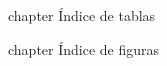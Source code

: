 \documentclass[a4paper,12pt,proyecto]{iietesis}
\begin{document}
\appendix





\backmatter

\nocite{*} %

\newpage{}%



\newpage{} {chapter} {\'Indice de tablas}%
\listoftables %

\newpage\newpage{} {chapter} {\'Indice de figuras}%
\listoffigures %




\lastpage
\end{document}

